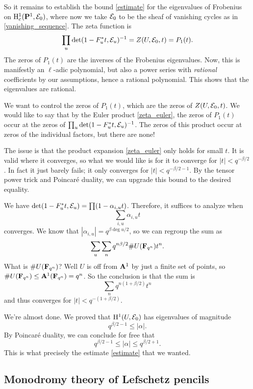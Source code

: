 So it remains to establish the bound \eqref{estimate} for the eigenvalues of Frobenius on $\mathrm{H}_c^1(\mathbf{P}^1, \mathcal{E}_0)$, where now we take $\mathcal{E}_0$ to be the sheaf of vanishing cycles as in \eqref{vanishing_sequence}. The zeta function is 
\begin{equation}\label{zeta_euler}
\prod_u \det (1-F_u^*t, \mathcal{E}_u)^{-1} = Z(U, \mathcal{E}_0, t) = P_1(t).
\end{equation}
The zeros of $P_1(t)$ are the inverses of the Frobenius eigenvalues. Now, this is manifestly an $\ell$-adic polynomial, but also a power series with \emph{rational} coefficients by our assumptions, hence a rational polynomial. This shows that the eigenvalues are rational. 

We want to control the zeros of $P_1(t)$, which are the zeros of $Z(U, \mathcal{E}_0, t)$. We would like to say that by the Euler product \eqref{zeta_euler}, the zeros of $P_1(t)$ occur at the zeros of $\prod_u \det (1-F_u^*t, \mathcal{E}_u)^{-1}$. The zeros of this product occur at zeros of the individual factors, but there are none! 

The issue is that the product expansion \eqref{zeta_euler} only holds for small $t$. It is valid where it converges, so what we would like is for it to converge for $|t| < q^{-\beta/2}$. In fact it just barely fails; it only converges for $|t|<q^{-\beta/2-1}$. By the tensor power trick and Poincar\'{e} duality, we can upgrade this bound to the desired equality. 

We have $\det (1-F_u^*t, \mathcal{E}_u) = \prod (1-\alpha_{i,u} t)$. Therefore, it suffices to analyze when 
\[
\sum_{i,u} \alpha_{i,u} t
\]
converges. We know that $|\alpha_{i,u}| = q^{\beta \deg u/2}$, so we can regroup the sum as 
\[
\sum_u \sum_n q^{n\beta /2} \#U(\mathbf{F}_{q^n}) t^n.
\]
What is $\#U(\mathbf{F}_{q^n})$? Well $U$ is off from $\mathbf{A}^1$ by just a finite set of points, so $\# U(\mathbf{F}_{q^n}) \leq \mathbf{A}^1(\mathbf{F}_{q^n}) = q^n$. So the conclusion is that the sum is 
\[
\sum_n q^{n(1+\beta/2)} t^n
\]
and thus converges for $|t|<q^{-(1+\beta/2)}$. 

We're almost done. We proved that $\mathrm{H}^1(U, \mathcal{E}_0)$ has eigenvalues of magnitude
\[
q^{\beta/2-1} \leq |\alpha|.
\]
By Poincar\'{e} duality, we can conclude for free that 
\[
q^{\beta/2-1} \leq |\alpha| \leq q^{\beta/2+1}.
\]
This is what precisely the estimate \eqref{estimate} that we wanted. 


\subsection{Monodromy theory of Lefschetz pencils}\label{Lefschetz_pencil}

